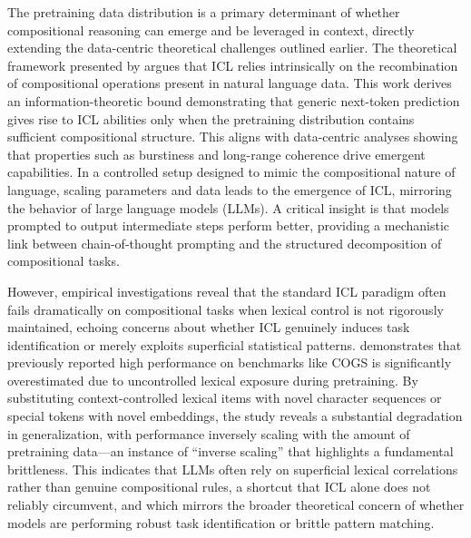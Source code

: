 \documentclass[11pt]{article}
\begin{document}
The pretraining data distribution is a primary determinant of whether compositional reasoning can emerge and be leveraged in context, directly extending the data-centric theoretical challenges outlined earlier. The theoretical framework presented by \cite{ref108} argues that ICL relies intrinsically on the recombination of compositional operations present in natural language data. This work derives an information-theoretic bound demonstrating that generic next-token prediction gives rise to ICL abilities only when the pretraining distribution contains sufficient compositional structure. This aligns with data-centric analyses showing that properties such as burstiness and long-range coherence drive emergent capabilities. In a controlled setup designed to mimic the compositional nature of language, scaling parameters and data leads to the emergence of ICL, mirroring the behavior of large language models (LLMs). A critical insight is that models prompted to output intermediate steps perform better, providing a mechanistic link between chain-of-thought prompting and the structured decomposition of compositional tasks.

However, empirical investigations reveal that the standard ICL paradigm often fails dramatically on compositional tasks when lexical control is not rigorously maintained, echoing concerns about whether ICL genuinely induces task identification or merely exploits superficial statistical patterns. \cite{ref604} demonstrates that previously reported high performance on benchmarks like COGS is significantly overestimated due to uncontrolled lexical exposure during pretraining. By substituting context-controlled lexical items with novel character sequences or special tokens with novel embeddings, the study reveals a substantial degradation in generalization, with performance inversely scaling with the amount of pretraining data---an instance of ``inverse scaling'' that highlights a fundamental brittleness. This indicates that LLMs often rely on superficial lexical correlations rather than genuine compositional rules, a shortcut that ICL alone does not reliably circumvent, and which mirrors the broader theoretical concern of whether models are performing robust task identification or brittle pattern matching.
\end{document}
